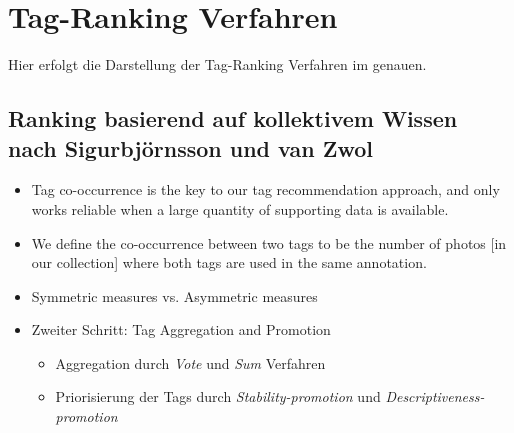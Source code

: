 \section{Tag-Ranking Verfahren} %
\label{sec:tag_ranking_verfahren}
Hier erfolgt die Darstellung der Tag-Ranking Verfahren im genauen.

% 
% 

\subsection{Ranking basierend auf kollektivem Wissen nach Sigurbjörnsson und van Zwol} %
\label{sub:ranking_basierend_auf_kollektivem_wissen_nach_zwol_et_al_}

\begin{itemize}
  \item Tag co-occurrence is the key to our tag recommendation approach, and only works reliable when a large quantity of supporting data is available.
  \item We define the co-occurrence between two tags to be the number of photos [in our collection] where both tags are used in the same annotation.
  \item Symmetric measures vs. Asymmetric measures
  \item Zweiter Schritt: Tag Aggregation and Promotion
  \begin{itemize}
    \item Aggregation durch \emph{Vote} und \emph{Sum} Verfahren
    \item Priorisierung der Tags durch \emph{Stability-promotion} und \emph{Descriptiveness-promotion}
  \end{itemize}
\end{itemize}

